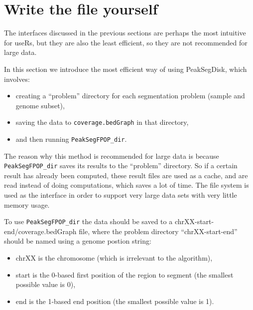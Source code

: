 \documentclass[12pt]{article}\usepackage[]{graphicx}\usepackage[]{color}
\begin{document}
\section{Write the file yourself}

The interfaces discussed in the previous sections are perhaps the most
intuitive for useRs, but they are also the least efficient, so they
are not recommended for large data. 

In this section we introduce the most efficient way of using PeakSegDisk, which involves:

\begin{itemize}
\item creating a ``problem'' directory for each segmentation problem
  (sample and genome subset),
\item saving the data to \verb|coverage.bedGraph| in that directory,
\item and then running \verb|PeakSegFPOP_dir|.
\end{itemize}

The reason why this method is recommended for large data is because
\verb|PeakSegFPOP_dir| saves its results to the ``problem'' directory. So
if a certain result has already been computed, these result files are
used as a cache, and are read instead of doing computations, which
saves a lot of time. 
The file system is used as the interface in
order to support very large data sets with very little memory usage.

To use \verb|PeakSegFPOP_dir| the data should be saved to a
chrXX-start-end/coverage.bedGraph file, where the problem directory
``chrXX-start-end'' should be named using a genome postion string:

\begin{itemize}
\item chrXX is the chromosome (which is irrelevant to the algorithm),
\item start is the 0-based first position of the region to segment (the smallest possible value is 0),
\item end is the 1-based end position (the smallest possible value is 1).
\end{itemize}
\end{document}
